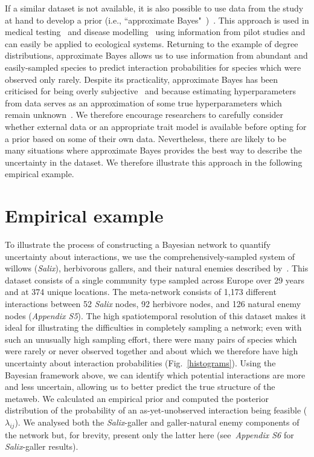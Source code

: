\documentclass[12pt]{article}
\begin{document}
\begin{spacing}{2.0}
        If a similar dataset is not available, it is also possible to use data from the study at hand to develop a prior (i.e., ``approximate Bayes"~\citet{Gelmanblog})~\citep{Spiegelhalter2000}. This approach is used in medical testing~\citep{Spiegelhalter2000} and disease modelling~\citep{Leyland2005} using information from pilot studies and can easily be applied to ecological systems. Returning to the example of degree distributions, approximate Bayes allows us to use information from abundant and easily-sampled species to predict interaction probabilities for species which were observed only rarely. Despite its practicality, approximate Bayes has been criticised for being overly subjective~\citep{Berger2006} and because estimating hyperparameters from data serves as an approximation of some true hyperparameters which remain unknown~\citep{Gelmanblog}. We therefore encourage researchers to carefully consider whether external data or an appropriate trait model is available before opting for a prior based on some of their own data. Nevertheless, there are likely to be many situations where approximate Bayes provides the best way to describe the uncertainty in the dataset. We therefore illustrate this approach in the following empirical example.


  \section*{Empirical example}

      To illustrate the process of constructing a Bayesian network to quantify uncertainty about interactions, we use the comprehensively-sampled system of willows (\emph{Salix}), herbivorous gallers, and their natural enemies described by~\citet{Kopelke2017}. This dataset consists of a single community type sampled across Europe over 29 years and at 374 unique locations. The meta-network consists of 1,173 different interactions between 52 \emph{Salix} nodes, 92 herbivore nodes, and 126 natural enemy nodes (\emph{Appendix S5}). 
      The high spatiotemporal resolution of this dataset makes it ideal for illustrating the difficulties in completely sampling a network; even with such an unusually high sampling effort, there were many pairs of species which were rarely or never observed together and about which we therefore have high uncertainty about interaction probabilities (Fig.~\ref{histograms}). Using the Bayesian framework above, we can identify which potential interactions are more and less uncertain, allowing us to better predict the true structure of the metaweb. 
      We calculated an empirical prior and computed the posterior distribution of the probability of an as-yet-unobserved interaction being feasible ($\lambda_{ij}$). We analysed both the \emph{Salix}-galler and galler-natural enemy components of the network but, for brevity, present only the latter here (see~\emph{Appendix S6} for \emph{Salix}-galler results).



\end{spacing}
\end{document}
